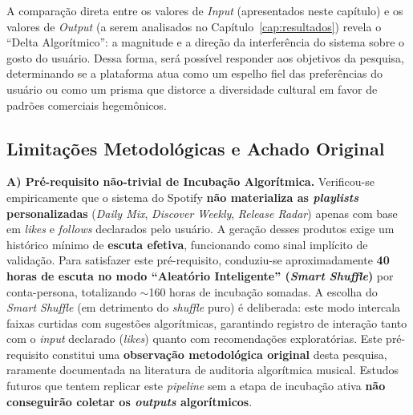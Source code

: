 \documentclass[12pt, %
openright,
oneside, %
a4paper,    %
english,   %
brazil]{facom-ufu-abntex2}
\begin{document}
A comparação direta entre os valores de \emph{Input} (apresentados neste
capítulo) e os valores de \emph{Output} (a serem analisados no
Capítulo~\ref{cap:resultados}) revela o ``Delta Algorítmico'': a magnitude e a
direção da interferência do sistema sobre o gosto do usuário. Dessa forma, será
possível responder aos objetivos da pesquisa, determinando se a plataforma atua
como um espelho fiel das preferências do usuário ou como um prisma que distorce a
diversidade cultural em favor de padrões comerciais hegemônicos.

\subsection{Limitações Metodológicas e Achado Original}

\textbf{A) Pré-requisito não-trivial de Incubação Algorítmica.} Verificou-se
empiricamente que o sistema do Spotify \textbf{não materializa as \emph{playlists}
personalizadas} (\emph{Daily Mix}, \emph{Discover Weekly}, \emph{Release Radar})
apenas com base em \emph{likes} e \emph{follows} declarados pelo usuário. A
geração desses produtos exige um histórico mínimo de \textbf{escuta efetiva},
funcionando como sinal implícito de validação. Para satisfazer este
pré-requisito, conduziu-se aproximadamente \textbf{40 horas de escuta no modo
``Aleatório Inteligente'' (\emph{Smart Shuffle})} por conta-persona, 
totalizando $\sim$160 horas de incubação somadas. A escolha do \emph{Smart
Shuffle} (em detrimento do \emph{shuffle} puro) é deliberada: este modo intercala
faixas curtidas com sugestões algorítmicas, garantindo registro de interação
tanto com o \emph{input} declarado (\emph{likes}) quanto com recomendações
exploratórias. Este pré-requisito constitui uma \textbf{observação metodológica
original} desta pesquisa, raramente documentada na literatura de auditoria
algorítmica musical. Estudos futuros que tentem replicar este \emph{pipeline} sem
a etapa de incubação ativa \textbf{não conseguirão coletar os \emph{outputs}
algorítmicos}.
\end{document}
